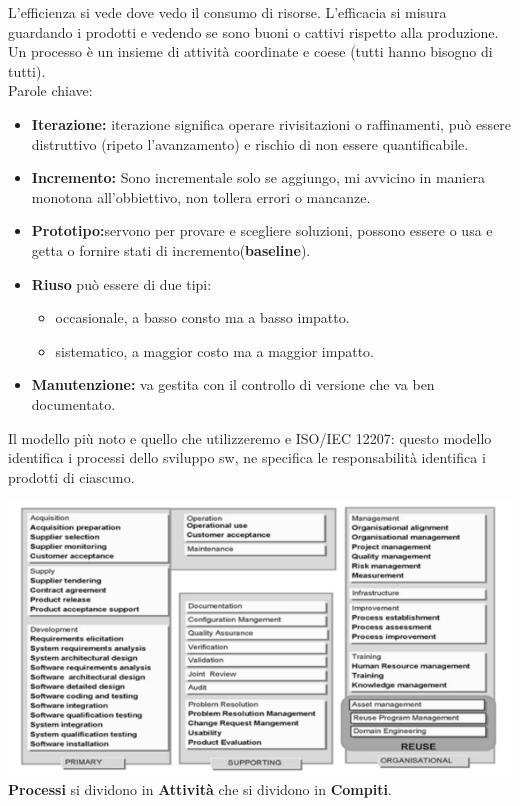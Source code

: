 L'efficienza si vede dove vedo il consumo di risorse. L'efficacia si misura guardando i prodotti e vedendo se sono buoni o cattivi rispetto alla produzione. Un processo è un insieme di attività coordinate e coese (tutti hanno bisogno di tutti).\\
Parole chiave:
\begin{itemize}
	\item\textbf{Iterazione:} iterazione significa operare rivisitazioni o raffinamenti, può essere distruttivo (ripeto l'avanzamento) e rischio di non essere quantificabile.
	\item\textbf{Incremento:} Sono incrementale solo se aggiungo, mi avvicino in maniera monotona all'obbiettivo, non tollera errori o mancanze.
	\item\textbf{Prototipo:}servono per provare e scegliere soluzioni, possono essere o usa e getta o fornire stati di incremento(\textbf{baseline}).
	\item\textbf{Riuso} può essere di due tipi:
	\begin{itemize}
	
		\item occasionale, a basso consto ma a basso impatto.
		\item sistematico, a maggior costo ma a maggior impatto.
	\end{itemize}
	\item \textbf{Manutenzione:} va gestita con il controllo di versione che va ben documentato.
\end{itemize}

Il modello più noto e quello che utilizzeremo e ISO/IEC 12207: questo modello identifica i processi dello sviluppo sw, ne specifica le responsabilità identifica i prodotti di ciascuno.

\includegraphics[width=0.75\columnwidth]{img3} %
\\
\textbf{Processi} si dividono in \textbf{Attività} che si dividono in \textbf{Compiti}.

